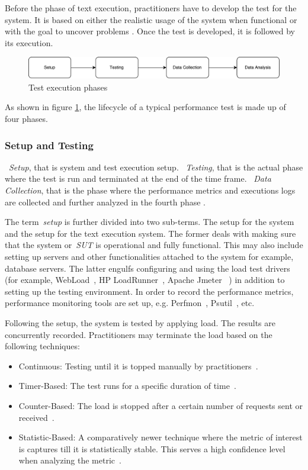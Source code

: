 Before the phase of text execution, practitioners have to develop the test for the system. It is based on either the realistic usage of the system when functional or with the goal to uncover problems \cite{jiang2015survey}.
Once the test is developed, it is followed by its execution. 

\begin{figure}[thb!]
	\centering
	\includegraphics[width=1\textwidth]{figures/bck1.pdf}
	\caption{Test execution phases}
	\label{fig:test_phases}
\end{figure}

As shown in figure \ref{fig:test_phases}, the lifecycle of a typical performance test is made up of four phases. 

\subsubsection{Setup and Testing}

~\textit{Setup}, that is system and test execution setup. ~\textit{Testing}, that is the actual phase where the test is run and terminated at the end of the time frame. ~\textit{Data Collection}, that is the phase where the performance metrics and executions logs are collected and further analyzed in the fourth phase \cite{jiang2015survey}.

The term~\textit{setup} is further divided into two sub-terms. The setup for the system and the setup for the text execution system. The former deals with making sure that the system or~\textit{SUT} is operational and fully functional. This may also include setting up servers and other functionalities attached to the system for example, database servers. The latter engulfs configuring and using the load test drivers (for example, WebLoad~\cite{webload}, HP LoadRunner~\cite{loadrunner}, Apache Jmeter ~\cite{apachejmeter}) in addition to setting up the testing environment. In order to record the performance metrics, performance monitoring tools are set up, e.g. Perfmon~\cite{perfmon}, Psutil~\cite{psutil}, etc. 

Following the setup, the system is tested by applying load. The results are concurrently recorded. Practitioners may terminate the load based on the following techniques:

\begin{itemize}
	\item Continuous: Testing until it is topped manually by practitioners~\cite{4017687}.
	\item Timer-Based: The test runs for a specific duration of time~\cite{4017687}.
	\item Counter-Based: The load is stopped after a certain number of requests sent or received~\cite{4017687}.
	\item Statistic-Based: A comparatively newer technique where the metric of interest is captures till it is statistically stable. This serves a high confidence level when analyzing the metric~\cite{mansharamani2010performance,snellman2011towards}.
\end{itemize}

